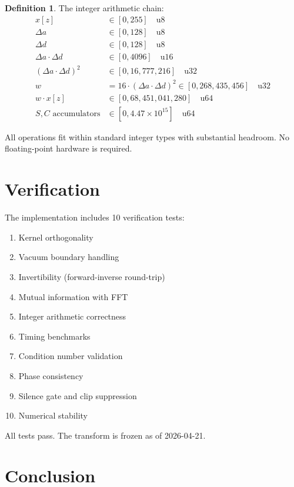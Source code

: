 \documentclass[12pt,a4paper]{article}
\theoremstyle{definition}
\newtheorem{definition}{Definition}
\begin{document}
\begin{definition}
The integer arithmetic chain:
\begin{align}
x[z] &\in [0, 255] \quad \text{u8} \\
\Delta a &\in [0, 128] \quad \text{u8} \\
\Delta d &\in [0, 128] \quad \text{u8} \\
\Delta a \cdot \Delta d &\in [0, 4096] \quad \text{u16} \\
(\Delta a \cdot \Delta d)^2 &\in [0, 16{,}777{,}216] \quad \text{u32} \\
w &= 16 \cdot (\Delta a \cdot \Delta d)^2 \in [0, 268{,}435{,}456] \quad \text{u32} \\
w \cdot x[z] &\in [0, 68{,}451{,}041{,}280] \quad \text{u64} \\
S, C \text{ accumulators} &\in [0, 4.47 \times 10^{15}] \quad \text{u64}
\end{align}
\end{definition}

All operations fit within standard integer types with substantial headroom. No floating-point hardware is required.

\section{Verification}

The implementation includes 10 verification tests:

\begin{enumerate}
    \item Kernel orthogonality
    \item Vacuum boundary handling
    \item Invertibility (forward-inverse round-trip)
    \item Mutual information with FFT
    \item Integer arithmetic correctness
    \item Timing benchmarks
    \item Condition number validation
    \item Phase consistency
    \item Silence gate and clip suppression
    \item Numerical stability
\end{enumerate}

All tests pass. The transform is frozen as of 2026-04-21.

\section{Conclusion}
\end{document}
